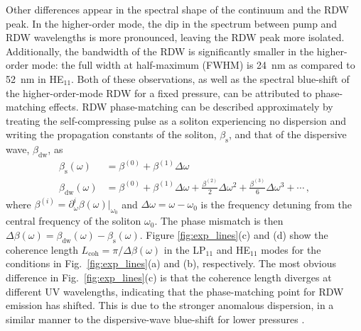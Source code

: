 \documentclass[amsmath, preprint, floatfix]{revtex4-2}
\begin{document}
Other differences appear in the spectral shape of the continuum and the RDW peak. In the higher-order mode, the dip in the spectrum between pump and RDW wavelengths is more pronounced, leaving the RDW peak more isolated. Additionally, the bandwidth of the RDW is significantly smaller in the higher-order mode: the full width at half-maximum (FWHM) is \SI{24}{\nm} as compared to \SI{52}{\nm} in HE$_{11}$. Both of these observations, as well as the spectral blue-shift of the higher-order-mode RDW for a fixed pressure, can be attributed to phase-matching effects. RDW phase-matching can be described approximately by treating the self-compressing pulse as a soliton experiencing no dispersion and writing the propagation constants of the soliton, $\beta_\mathrm{s}$, and that of the dispersive wave, $\beta_\mathrm{dw}$, as
\begin{align}
    \beta_\mathrm{s}(\omega) &= \beta^{(0)} + \beta^{(1)} \Delta\omega  \label{eq:bsol}\\ %
    \beta_\mathrm{dw}(\omega) &= \beta^{(0)} + \beta^{(1)} \Delta\omega + \frac{\beta^{(2)}}{2} \Delta\omega^2 + \frac{\beta^{(3)}}{6} \Delta\omega^3 + \cdots\,,
    \label{eq:blin}
\end{align}
where $\beta^{(i)} = \partial_\omega^i\beta(\omega)\vert_{\omega_0}$ and $\Delta\omega = \omega-\omega_0$ is the frequency detuning from the central frequency of the soliton $\omega_0$. The phase mismatch is then $\Delta\beta(\omega) = \beta_\mathrm{dw}(\omega) - \beta_\mathrm{s}(\omega)$. Figure \ref{fig:exp_lines}(c) and (d) show the coherence length $L_\mathrm{coh} = \pi/\Delta\beta(\omega)$ in the LP$_{11}$ and HE$_{11}$ modes for the conditions in Fig.~\ref{fig:exp_lines}(a) and (b), respectively. The most obvious difference in Fig.~\ref{fig:exp_lines}(c) is that the coherence length diverges at different UV wavelengths, indicating that the phase-matching point for RDW emission has shifted. This is due to the stronger anomalous dispersion, in a similar manner to the dispersive-wave blue-shift for lower pressures \cite{mak_tunable_2013,travers_high-energy_2019}.
\end{document}
